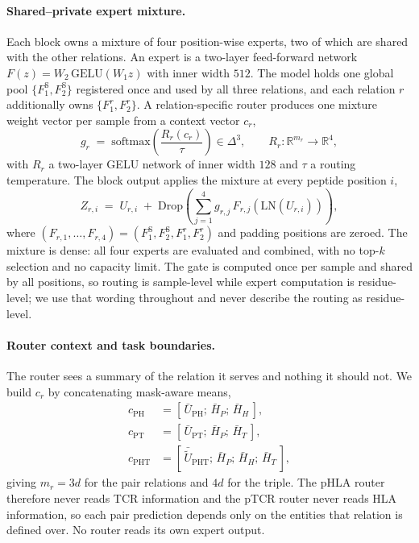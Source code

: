 \documentclass[webpdf,modern,large,namedate]{oup-authoring-template}
\theoremstyle{thmstyleone}
\theoremstyle{thmstyletwo}
\theoremstyle{thmstylethree}
\newcommand{\PH}{pHLA}
\newcommand{\PT}{pTCR}
\newcommand{\PHm}{\mathrm{PH}}
\newcommand{\PTm}{\mathrm{PT}}
\newcommand{\PHTm}{\mathrm{PHT}}
\newcommand{\LN}{\mathrm{LN}}
\newcommand{\softmax}{\mathrm{softmax}}
\newcommand{\dmodel}{d}
\begin{document}
\paragraph{Shared--private expert mixture.}
Each block owns a mixture of four position-wise experts, two of which are
shared with the other relations. An expert is a two-layer feed-forward network
$F(z)=W_2\,\mathrm{GELU}(W_1 z)$ with inner width $512$. The model holds one
global pool $\{F^{\mathrm{S}}_1,F^{\mathrm{S}}_2\}$ registered once and used by
all three relations, and each relation $r$ additionally owns
$\{F^{r}_1,F^{r}_2\}$. A relation-specific router produces one mixture weight
vector per sample from a context vector $c_r$,
\begin{equation}
g_r \;=\; \softmax\!\left(\frac{R_r(c_r)}{\tau}\right)\in\Delta^{3},
\qquad
R_r:\mathbb{R}^{m_r}\!\rightarrow\!\mathbb{R}^{4},
\label{eq:gate}
\end{equation}
with $R_r$ a two-layer GELU network of inner width $128$ and $\tau$ a routing
temperature. The block output applies the mixture at every peptide position
$i$,
\begin{equation}
Z_{r,i} \;=\; U_{r,i} \;+\; \mathrm{Drop}\!\left(\sum_{j=1}^{4}
g_{r,j}\,F_{r,j}\!\left(\LN(U_{r,i})\right)\right),
\label{eq:moe}
\end{equation}
where $(F_{r,1},\dots,F_{r,4}) = (F^{\mathrm{S}}_1,F^{\mathrm{S}}_2,
F^{r}_1,F^{r}_2)$ and padding positions are zeroed. The mixture is dense: all
four experts are evaluated and combined, with no top-$k$ selection and no
capacity limit. The gate is computed once per sample and shared by all
positions, so routing is sample-level while expert computation is
residue-level; we use that wording throughout and never describe the routing
as residue-level.

\paragraph{Router context and task boundaries.}
The router sees a summary of the relation it serves and nothing it should not.
We build $c_r$ by concatenating mask-aware means,
\begin{equation}
\begin{aligned}
c_{\PHm} &= [\,\bar U_{\PHm};\,\bar H_P;\,\bar H_H\,], \\
c_{\PTm} &= [\,\bar U_{\PTm};\,\bar H_P;\,\bar H_T\,], \\
c_{\PHTm} &= [\,\bar{\tilde U}_{\PHTm};\,\bar H_P;\,\bar H_H;\,\bar H_T\,],
\end{aligned}
\label{eq:context}
\end{equation}
giving $m_r=3\dmodel$ for the pair relations and $4\dmodel$ for the triple. The
\PH{} router therefore never reads TCR information and the \PT{} router never
reads HLA information, so each pair prediction depends only on the entities
that relation is defined over. No router reads its own expert output.
\end{document}
